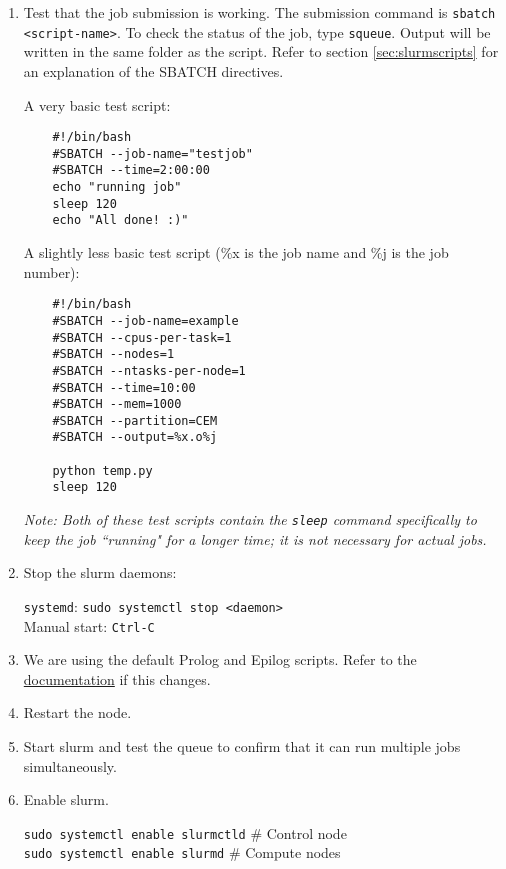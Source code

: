 \begin{enumerate}
\item Test that the job submission is working. The submission command is \texttt{sbatch <script-name>}. To check the status of the job, type \texttt{squeue}. Output will be written in the same folder as the script. Refer to section \ref{sec:slurmscripts} for an explanation of the SBATCH directives.

A very basic test script:
\begin{verbatim}
	#!/bin/bash
	#SBATCH --job-name="testjob"
	#SBATCH --time=2:00:00
	echo "running job"
	sleep 120
	echo "All done! :)"
\end{verbatim}

A slightly less basic test script (\%x is the job name and \%j is the job number):
\begin{verbatim}
	#!/bin/bash
	#SBATCH --job-name=example
	#SBATCH --cpus-per-task=1
	#SBATCH --nodes=1
	#SBATCH --ntasks-per-node=1
	#SBATCH --time=10:00
	#SBATCH --mem=1000
	#SBATCH --partition=CEM
	#SBATCH --output=%x.o%j

	python temp.py
	sleep 120
\end{verbatim}

\emph{Note: Both of these test scripts contain the \emph{\texttt{sleep}} command specifically to keep the job ``running" for a longer time; it is not necessary for actual jobs.}

\item Stop the slurm daemons: 

	\texttt{systemd}: \texttt{sudo systemctl stop <daemon>} \\
	Manual start: \texttt{Ctrl-C}

\item We are using the default Prolog and Epilog scripts. Refer to the \href{https://slurm.schedmd.com/slurm.conf.html}{documentation} if this changes.

\item Restart the node.
	
\item Start slurm and test the queue to confirm that it can run multiple jobs simultaneously.

\item Enable slurm.

	\texttt{sudo systemctl enable slurmctld} \quad \# Control node \\
	\texttt{sudo systemctl enable slurmd} \quad \# Compute nodes 
	
\end{enumerate}

